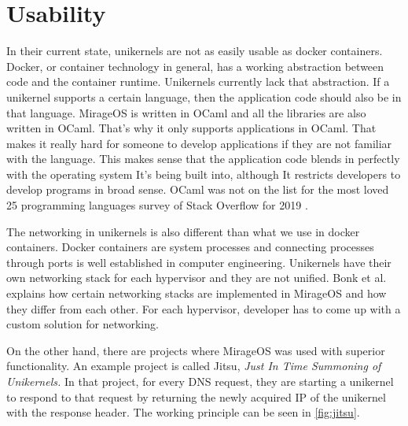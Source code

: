 \section{Usability}
In their current state, unikernels are not as easily usable as docker containers. Docker, or container technology in general, has a working abstraction between code and the container runtime. Unikernels currently lack that abstraction. If a unikernel supports a certain language, then the application code should also be in that language. MirageOS is written in OCaml and all the libraries are also written in OCaml. That's why it only supports applications in OCaml. That makes it really hard for someone to develop applications if they are not familiar with the language. This makes sense that the application code blends in perfectly with the operating system It's being built into, although It restricts developers to develop programs in broad sense. OCaml was not on the list for the most loved 25 programming languages survey of Stack Overflow for 2019 \cite{2019-survey}.

The networking in unikernels is also different than what we use in docker containers. Docker containers are system processes and connecting processes through ports is well established in computer engineering. Unikernels have their own networking stack for each hypervisor and they are not unified. Bonk et al. \cite{Bonk} explains how certain networking stacks are implemented in MirageOS and how they differ from each other. For each hypervisor, developer has to come up with a custom solution for networking.

On the other hand, there are projects where MirageOS was used with superior functionality. An example project is called Jitsu\cite{jitsu}, \textit{Just In Time Summoning of Unikernels.} In that project, for every DNS request, they are starting a unikernel to respond to that request by returning the newly acquired IP of the unikernel with the response header. The working principle can be seen in \ref{fig:jitsu}.

